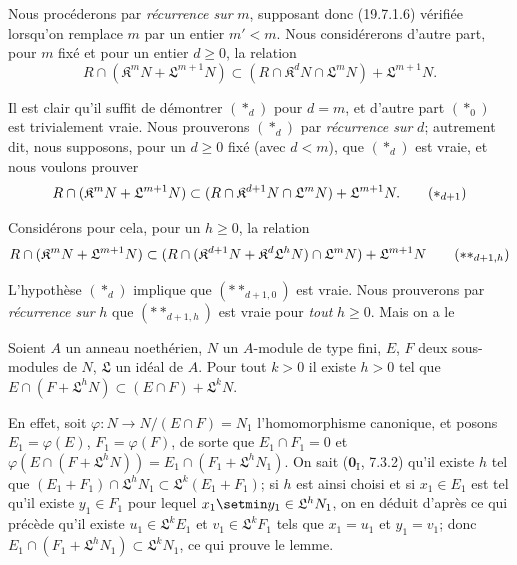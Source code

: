 
Nous procéderons par \emph{récurrence sur} $m$, supposant donc (19.7.1.6) vérifiée lorsqu'on remplace $m$ par un entier $m'<m$. Nous considérerons d'autre part, pour $m$ fixé et pour un entier $d\geq0$, la relation
\begin{equation}
  R\cap(\mathfrak K^mN+\mathfrak L^{m+1}N)\subset(R\cap\mathfrak K^dN\cap\mathfrak L^mN)+\mathfrak L^{m+1}N.
  \tag{$*_d$}
\end{equation}

Il est clair qu'il suffit de démontrer $(*_d)$ pour $d=m$, et d'autre part $(*_0)$ est trivialement vraie. Nous prouverons $(*_d)$ par \emph{récurrence sur} $d$; autrement dit, nous supposons, pour un $d\geq0$ fixé (avec $d<m$), que $(*_d)$ est vraie, et nous voulons prouver
\begin{equation}
  R\cap(\mathfrak K^mN+\mathfrak L^{m+1}N)\subset(R\cap\mathfrak K^{d+1}N\cap\mathfrak L^mN)+\mathfrak L^{m+1}N.
  \tag{$*_{d+1}$}
\end{equation}

Considérons pour cela, pour un $h\geq0$, la relation
\begin{equation}
  R\cap(\mathfrak K^mN+\mathfrak L^{m+1}N)\subset(R\cap(\mathfrak K^{d+1}N+\mathfrak K^d\mathfrak L^hN)\cap\mathfrak L^mN)+\mathfrak L^{m+1}N
  \tag{$**_{d+1,h}$}
\end{equation}

L'hypothèse $(*_d)$ implique que $(**_{d+1,0})$ est vraie. Nous prouverons par \emph{récurrence sur} $h$ que $(**_{d+1,h})$ est vraie pour \emph{tout} $h\geq0$. Mais on a le

\begin{lemma}[19.7.1.7]
\label{IV.19.7.1.7}
Soient $A$ un anneau noethérien, $N$ un $A$-module de type fini, $E$, $F$ deux sous-modules de $N$, $\mathfrak L$ un idéal de $A$. Pour tout $k>0$ il existe $h>0$ tel que $E\cap(F+\mathfrak L^hN)\subset(E\cap F)+\mathfrak L^kN$.
\end{lemma}

En effet, soit $\varphi:N\to N/(E\cap F)=N_1$ l'homomorphisme canonique, et posons $E_1=\varphi(E)$, $F_1=\varphi(F)$, de sorte que $E_1\cap F_1=0$ et $\varphi(E\cap(F+\mathfrak L^hN))=E_1\cap(F_1+\mathfrak L^hN_1)$. On sait ($\mathbf{0}_{\mathrm I}$, 7.3.2) qu'il existe $h$ tel que $(E_1+F_1)\cap\mathfrak L^hN_1\subset\mathfrak L^k(E_1+F_1)$; si $h$ est ainsi choisi et si $x_1\in E_1$ est tel qu'il existe $y_1\in F_1$ pour lequel $x_1\setmin y_1\in\mathfrak L^hN_1$, on en déduit d'après ce qui précède qu'il existe $u_1\in\mathfrak L^kE_1$ et $v_1\in\mathfrak L^kF_1$ tels que $x_1=u_1$ et $y_1=v_1$; donc $E_1\cap(F_1+\mathfrak L^hN_1)\subset\mathfrak L^kN_1$, ce qui prouve le lemme.

